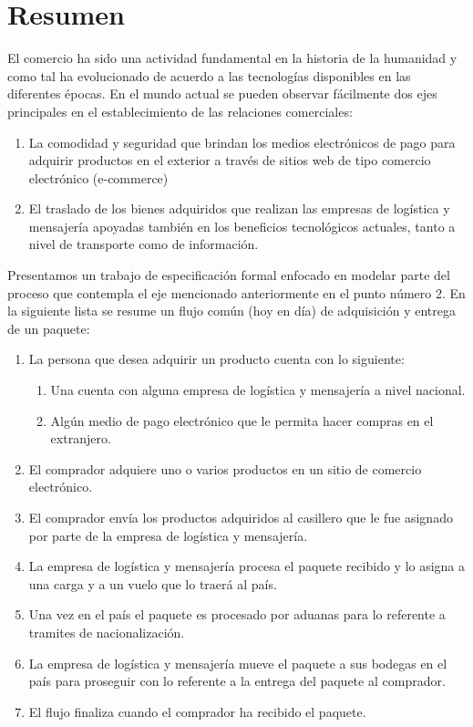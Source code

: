 \documentclass[12pt,a4paper,table]{article}
\begin{document}
\section{Resumen}
El comercio ha sido una actividad fundamental en la historia de la humanidad y como tal ha evolucionado de acuerdo a las tecnologías disponibles en las diferentes épocas. 
En el mundo actual se pueden observar fácilmente dos ejes principales en el establecimiento de las relaciones comerciales: 
\begin{enumerate}
\item La comodidad y seguridad que brindan los medios electrónicos de pago para adquirir productos en el exterior a través de sitios web de tipo comercio electrónico (e-commerce)
\item El traslado de los bienes adquiridos que realizan las empresas de logística y mensajería apoyadas también en los beneficios tecnológicos actuales, tanto a nivel de transporte como de información.
\end{enumerate}
Presentamos un trabajo de especificación formal enfocado en modelar parte del proceso que contempla el eje mencionado anteriormente en el punto número 2. En la siguiente lista se resume un flujo común (hoy en día) de adquisición y entrega de un paquete:
\begin{enumerate}
\item La persona que desea adquirir un producto cuenta con lo siguiente:
\begin{enumerate}
\item Una cuenta con alguna empresa de logística y mensajería a nivel nacional.
\item Algún medio de pago electrónico que le permita hacer compras en el extranjero.
\end{enumerate}
\item El comprador adquiere uno o varios productos en un sitio de comercio electrónico.
\item El comprador envía los productos adquiridos al casillero que le fue asignado por parte de la empresa de logística y mensajería.
\item La empresa de logística y mensajería procesa el paquete recibido y lo asigna a una carga y a un vuelo que lo traerá al país.
\item Una vez en el país el paquete es procesado por aduanas para lo referente a tramites de nacionalización.
\item La empresa de logística y mensajería mueve el paquete a sus bodegas en el país para proseguir con lo referente a la entrega del paquete al comprador.
\item El flujo finaliza cuando el comprador ha recibido el paquete.
\end{enumerate}
\end{document}
